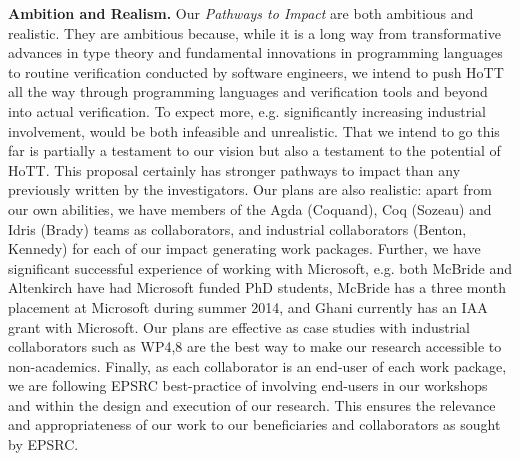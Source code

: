 \documentclass[a4paper,11pt]{article}
\begin{document}
{\bf Ambition and Realism.} Our {\em Pathways to Impact} are both
ambitious and realistic. They are ambitious because, while it is a
long way from transformative advances in type theory and fundamental
innovations in programming languages to routine
verification conducted by software engineers, we intend to push
HoTT all the way through programming languages and verification tools and
beyond into actual verification. To expect more,
e.g. significantly increasing industrial involvement, would be both
infeasible and unrealistic. That we intend to go this far is partially a
testament to our vision but also a testament to the potential of
HoTT. This proposal certainly has stronger pathways to impact than any
previously written by the investigators. Our plans are also realistic:
apart from our own abilities, we have members of the Agda (Coquand),
Coq (Sozeau) and Idris (Brady) teams as collaborators, and industrial
collaborators (Benton, Kennedy) for each of our impact generating work
packages. Further, we have significant successful experience of
working with Microsoft, e.g. both McBride and Altenkirch have had
Microsoft funded PhD students, McBride has a three month placement
at Microsoft during summer 2014, and Ghani currently has an IAA
grant with Microsoft. Our plans are effective as case studies with industrial
collaborators such as WP4,8 are the best way to make our research
accessible to non-academics. Finally, as each collaborator is
an end-user of each work package, we are following EPSRC best-practice
of involving end-users in our workshops and within the 
design and execution of our research. This ensures the relevance and
appropriateness of our work to our beneficiaries and
collaborators as sought by EPSRC.





\end{document}
